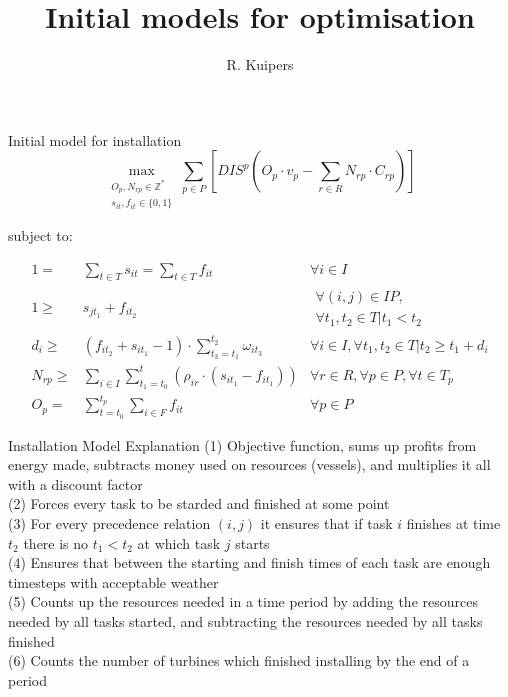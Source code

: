 \documentclass{beamer}
\title[Initial models for optimisation]{Initial models for optimisation}
\author{R. Kuipers}
\begin{document}
\begin{frame}
  \titlepage
\end{frame}

\begin{frame}{Initial model for installation}
\footnotesize
\begin{equation}
	\max_{\substack{O_p, N_{rp} \in \mathbb{Z}^* \\ s_{it}, f_{it} \in \{0, 1\}}} \sum_{p \in P} [ DIS^p (O_p \cdot v_p - \sum_{r \in R} N_{rp} \cdot C_{rp}) ]
\end{equation}

\bigskip
subject to:

\begin{align}
1 =& \sum_{t \in T} s_{it}	= \sum_{t \in T} f_{it}										&	\forall i \in I 						\\
1 \geq& s_{jt_1} + f_{it_2}											&	\begin{aligned} \forall (i, j) \in IP, \\
																	\forall t_1, t_2 \in T | t_1 < t_2 \end{aligned} \\
d_i \geq& (f_{it_2} + s_{it_1} - 1) \cdot \sum_{t_3 = t_1}^{t_2} \omega_{it_3} 				& \forall i \in I, \forall t_1, t_2 \in T | t_2 \geq t_1 + d_i	\\
N_{rp} \geq& \sum_{i\in I} \sum_{t_1 = t_0}^t (\rho_{ir} \cdot (s_{it_1} - f_{it_1})) 				& \forall r \in R, \forall p \in P, \forall t \in T_p 	\\
O_p =&  \sum_{t = t_0}^{t_p} \sum_{i \in F} f_{it}									& \forall p \in P
\end{align}

\end{frame}

\begin{frame}{Installation Model Explanation}
(1) Objective function, sums up profits from energy made, subtracts money used on resources (vessels), and multiplies it all with a discount factor	\\
(2) Forces every task to be starded and finished at some point	\\
(3) For every precedence relation $(i, j)$ it ensures that if task $i$ finishes at time $t_2$ there is no $t_1 < t_2$ at which task $j$ starts 	\\
(4) Ensures that between the starting and finish times of each task are enough timesteps with acceptable weather	\\
(5) Counts up the resources needed in a time period by adding the resources needed by all tasks started, and subtracting the resources needed by all tasks finished	\\
(6) Counts the number of turbines which finished installing by the end of a period	
\end{frame}
\end{document}
